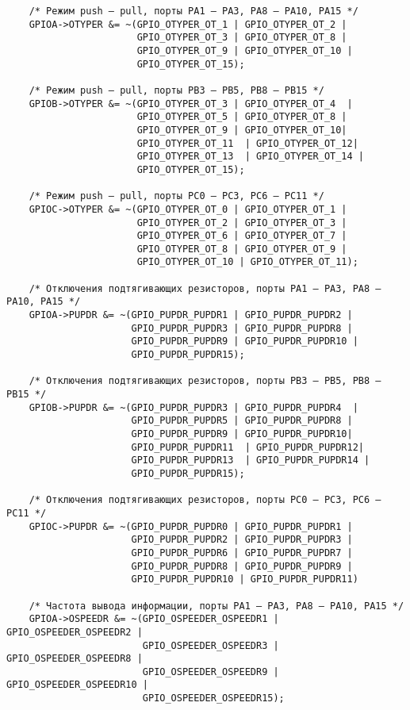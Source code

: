 \begin{verbatim}
    /* Режим push – pull, порты PA1 – PA3, PA8 – PA10, PA15 */                 
    GPIOA->OTYPER &= ~(GPIO_OTYPER_OT_1 | GPIO_OTYPER_OT_2 |
                       GPIO_OTYPER_OT_3 | GPIO_OTYPER_OT_8 |
                       GPIO_OTYPER_OT_9 | GPIO_OTYPER_OT_10 |
                       GPIO_OTYPER_OT_15);
    
    /* Режим push – pull, порты PB3 – PB5, PB8 – PB15 */
    GPIOB->OTYPER &= ~(GPIO_OTYPER_OT_3 | GPIO_OTYPER_OT_4  | 
                       GPIO_OTYPER_OT_5 | GPIO_OTYPER_OT_8 | 
                       GPIO_OTYPER_OT_9 | GPIO_OTYPER_OT_10| 
                       GPIO_OTYPER_OT_11  | GPIO_OTYPER_OT_12|
                       GPIO_OTYPER_OT_13  | GPIO_OTYPER_OT_14 | 
                       GPIO_OTYPER_OT_15);
    
    /* Режим push – pull, порты PC0 – PC3, PC6 – PC11 */
    GPIOC->OTYPER &= ~(GPIO_OTYPER_OT_0 | GPIO_OTYPER_OT_1 | 
                       GPIO_OTYPER_OT_2 | GPIO_OTYPER_OT_3 |
                       GPIO_OTYPER_OT_6 | GPIO_OTYPER_OT_7 | 
                       GPIO_OTYPER_OT_8 | GPIO_OTYPER_OT_9 |  
                       GPIO_OTYPER_OT_10 | GPIO_OTYPER_OT_11);
    
    /* Отключения подтягивающих резисторов, порты PA1 – PA3, PA8 – PA10, PA15 */
    GPIOA->PUPDR &= ~(GPIO_PUPDR_PUPDR1 | GPIO_PUPDR_PUPDR2 |
                      GPIO_PUPDR_PUPDR3 | GPIO_PUPDR_PUPDR8 |
                      GPIO_PUPDR_PUPDR9 | GPIO_PUPDR_PUPDR10 |
                      GPIO_PUPDR_PUPDR15);

    /* Отключения подтягивающих резисторов, порты PB3 – PB5, PB8 – PB15 */
    GPIOB->PUPDR &= ~(GPIO_PUPDR_PUPDR3 | GPIO_PUPDR_PUPDR4  | 
                      GPIO_PUPDR_PUPDR5 | GPIO_PUPDR_PUPDR8 | 
                      GPIO_PUPDR_PUPDR9 | GPIO_PUPDR_PUPDR10| 
                      GPIO_PUPDR_PUPDR11  | GPIO_PUPDR_PUPDR12|
                      GPIO_PUPDR_PUPDR13  | GPIO_PUPDR_PUPDR14 | 
                      GPIO_PUPDR_PUPDR15);

    /* Отключения подтягивающих резисторов, порты PC0 – PC3, PC6 – PC11 */
    GPIOC->PUPDR &= ~(GPIO_PUPDR_PUPDR0 | GPIO_PUPDR_PUPDR1 | 
                      GPIO_PUPDR_PUPDR2 | GPIO_PUPDR_PUPDR3 |
                      GPIO_PUPDR_PUPDR6 | GPIO_PUPDR_PUPDR7 | 
                      GPIO_PUPDR_PUPDR8 | GPIO_PUPDR_PUPDR9 |  
                      GPIO_PUPDR_PUPDR10 | GPIO_PUPDR_PUPDR11)
    
    /* Частота вывода информации, порты PA1 – PA3, PA8 – PA10, PA15 */
    GPIOA->OSPEEDR &= ~(GPIO_OSPEEDER_OSPEEDR1 | GPIO_OSPEEDER_OSPEEDR2 |
                        GPIO_OSPEEDER_OSPEEDR3 | GPIO_OSPEEDER_OSPEEDR8 |
                        GPIO_OSPEEDER_OSPEEDR9 | GPIO_OSPEEDER_OSPEEDR10 |
                        GPIO_OSPEEDER_OSPEEDR15);


\end{verbatim}
